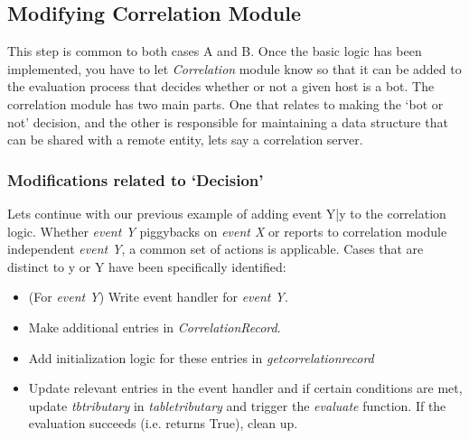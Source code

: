 \documentclass[acmtocl]{acmtrans2m}
\begin{document}
\subsection{Modifying Correlation Module}
This step is common to both cases A and B. Once the basic logic
has been implemented, you have to let \textit{Correlation} module know
so that it can be added to the evaluation process that decides
whether or not a given host is a bot.
The correlation module has two main parts. One that relates to 
making the `bot or not' decision, and the other is
responsible for maintaining a data structure that can 
be shared with a remote entity, lets say a correlation server.       

\subsubsection{Modifications related to `Decision'}
Lets continue with our previous example of adding event Y|y
to the correlation logic.
Whether \textit{event Y} piggybacks on
\textit{event X} or reports to correlation module independent
\textit{event Y}, a common set of actions is applicable. Cases
that are distinct to y or Y have been specifically identified:
\begin{itemize}
\item (For \textit{event Y}) Write event handler for \textit{event Y}.
\item Make additional entries in \textit{CorrelationRecord}.
\item Add initialization logic for these entries in  
\textit{get\textunderscore correlation\textunderscore record}
\item Update relevant entries in the event handler
and if certain conditions are met, update \textit{tb\textunderscore tributary} in
\textit{table\textunderscore tributary} and trigger the \textit{evaluate} function.
If the evaluation succeeds (i.e. returns True), clean up. 
\end{itemize}
\end{document}
